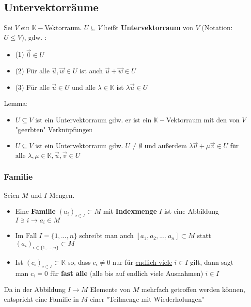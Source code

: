 \documentclass[titlepage]{article}
\newcommand{\K}{\mathbb{K}}
\newcommand{\1}{\mathbb{1}}
\newcommand{\0}{\mathbb{0}}
\begin{document}
			\subsection{Untervektorräume}
				Sei $V$ ein $\K-$Vektorraum. $U\subseteq V$ heißt \textbf{Untervektorraum} von $V$ (Notation: $U\le V$), gdw. :
				\begin{itemize}
					\item(1) $\vec{0}\in U$
					\item(2) Für alle $\vec{u},\vec{w}\in U$ ist auch $\vec{u}+\vec{w}\in U$
					\item(3) Für alle $\vec{u}\in U$ und alle $\lambda\in\K$ ist $\lambda\vec{u}\in U$
				\end{itemize}
				Lemma:
				\begin{itemize}
					\item $U\subseteq V$ ist ein Untervektorraum gdw. er ist ein $\K-$Vektorraum mit den von $V$ "geerbten" Verknüpfungen
					\item $U\subseteq V$ ist ein Untervektorraum gdw. $U\neq\emptyset$ und außerdem $\lambda\vec{u}+\mu\vec{v}\in U$ für alle $\lambda,\mu\in\K,\vec{u},\vec{v}\in U$
				\end{itemize}
				\subsubsection{Familie}
					Seien $M$ und $I$ Mengen.
					\begin{itemize}
						\item Eine \textbf{Familie} $(a_i)_{i\in I}\subset M$ mit \textbf{Indexmenge} $I$ ist eine Abbildung $I\ni i\rightarrow a_i\in M$
						\item Im Fall $I=\{1,...,n\}$ schreibt man auch $[a_1,a_2,...,a_n]\subset M$ statt $(a_i)_{i\in\{1,...,n\}}\subset M$
						\item Ist $(c_i)_{i\in I}\subset\K$ so, dass $c_i\neq0$ nur für \underline{endlich viele} $i\in I$ gilt, dann sagt man $c_i=0$ für \textbf{fast alle} (alle bis auf endlich viele Ausnahmen) $i\in I$
					\end{itemize}
					Da in der Abbildung $I\rightarrow M$ Elemente von $M$ mehrfach getroffen werden können, entspricht eine Familie in $M$ einer "Teilmenge mit Wiederholungen"
\end{document}
